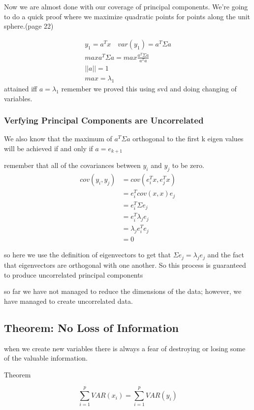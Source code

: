 Now we are almost done with our coverage of principal components. We're going to do a quick proof where we maximize quadratic points for points along the unit sphere.(page 22)

\begin{gather*}
    y_1 = a^Tx \quad var(y_1) = a^T \Sigma a\\
    max a^T \Sigma a = max \frac{a^T\Sigma a}{a^Ta}\\
    ||a|| = 1 \\
    max = \lambda_1
\end{gather*}
attained iff $a=\lambda_1$ remember we proved this using svd and doing changing of variables.

\subsubsection{Verfying Principal Components are Uncorrelated}
We also know that the maximum of $a^T\Sigma a$ orthogonal to the first k eigen values will be achieved if and only if $a = e_{k+1}$

remember that all of the covariances between $y_i$ and $y_j$ to be zero.
\begin{align*}
    cov(y_i,y_j) &= cov(e_i^Tx,e_j^Tx)\\
    &= e_i^T cov(x,x) e_j\\
    &= e_i^T \Sigma e_j\\
    &= e_i^T \lambda_j e_j\\
    &= \lambda_j e_i^T e_j\\
    &= 0
\end{align*}

so here we use the definition of eigenvectors to get that $\Sigma e_j = \lambda_j e_j$ and the fact that eigenvectors are orthogonal with one another. So this process is guaranteed to produce uncorrelated principal components

so far we have not managed to reduce the dimensions of the data; however, we have managed to create uncorrelated data.

\subsection{Theorem: No Loss of Information}
when we create new variables there is always a fear of destroying or losing some of the valuable information.

Theorem

\[ \displaystyle \sum _{i=1}^p VAR(x_i) = \displaystyle \sum _{i=1}^p VAR(y_i)\]

